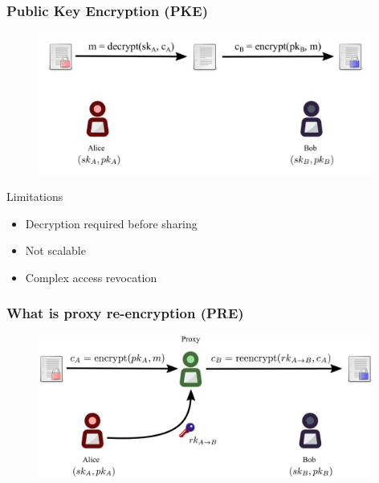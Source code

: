 \documentclass[xetex,mathsans,sans]{beamer}
\begin{document}
    \begin{frame}
        \frametitle{Public Key Encryption (PKE)}
        \begin{figure}
            \centering
            \includegraphics[width=11cm]{pdf/pke.pdf}
        \end{figure}

        Limitations
        \begin{itemize}
            \item Decryption required before sharing
            \item Not scalable
            \item Complex access revocation
        \end{itemize}
    \end{frame}

    \begin{frame}
        \frametitle{What is proxy re-encryption (PRE)}
        \begin{figure}
            \centering
            \includegraphics[width=11cm]{pdf/pre.pdf}
        \end{figure}
    \end{frame}
\end{document}
